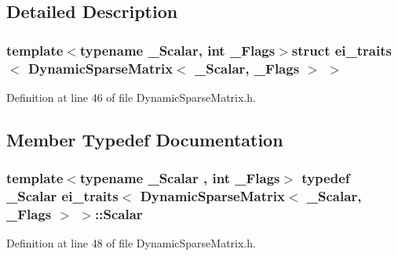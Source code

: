 \subsection{Detailed Description}
\subsubsection*{template$<$typename \-\_\-\-Scalar, int \-\_\-\-Flags$>$struct ei\-\_\-traits$<$ Dynamic\-Sparse\-Matrix$<$ \-\_\-\-Scalar, \-\_\-\-Flags $>$ $>$}



Definition at line 46 of file Dynamic\-Sparse\-Matrix.\-h.



\subsection{Member Typedef Documentation}
\hypertarget{structei__traits_3_01_dynamic_sparse_matrix_3_01___scalar_00_01___flags_01_4_01_4_a26ea3b7bf14931d326be11ead462c02f}{
\subsubsection[{Scalar}]{\setlength{\rightskip}{0pt plus 5cm}template$<$typename \-\_\-\-Scalar , int \-\_\-\-Flags$>$ typedef \-\_\-\-Scalar {\bf ei\-\_\-traits}$<$ {\bf Dynamic\-Sparse\-Matrix}$<$ \-\_\-\-Scalar, \-\_\-\-Flags $>$ $>$\-::{\bf Scalar}}}\label{structei__traits_3_01_dynamic_sparse_matrix_3_01___scalar_00_01___flags_01_4_01_4_a26ea3b7bf14931d326be11ead462c02f}


Definition at line 48 of file Dynamic\-Sparse\-Matrix.\-h.



